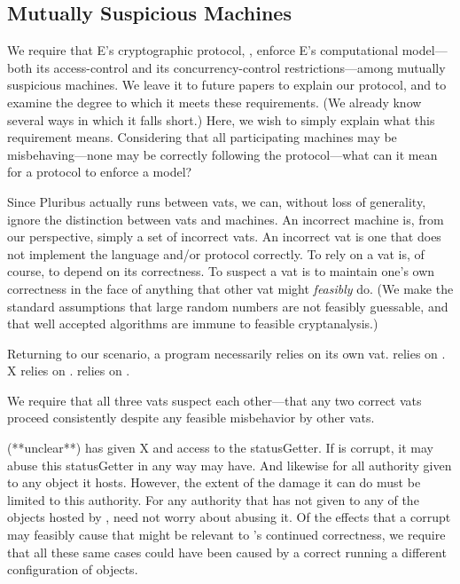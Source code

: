 \documentclass{llncs}
\begin{document}
\subsection{Mutually Suspicious Machines}

We require that E's cryptographic protocol, , enforce E's
computational model---both its access-control and its
concurrency-control restrictions---among mutually suspicious
machines. We leave it to future papers to explain our protocol, and to
examine the degree to which it meets these requirements. (We already
know several ways in which it falls short.) Here, we wish to simply
explain what this requirement means. Considering that all
participating machines may be misbehaving---none may be correctly
following the protocol---what can it mean for a protocol to enforce a
model?

Since Pluribus actually runs between vats, we can, without loss of
generality, ignore the distinction between vats and machines. An
incorrect machine is, from our perspective, simply a set of incorrect
vats. An incorrect vat is one that does not implement the language
and/or protocol correctly. To rely on a vat is, of course, to depend
on its correctness. To suspect a vat is to maintain one's own
correctness in the face of anything that other vat might
\emph{feasibly} do. (We make the standard assumptions that large
random numbers are not feasibly guessable, and that well accepted
algorithms are immune to feasible cryptanalysis.)

Returning to our scenario, a program necessarily relies on its own
vat.  relies on . X relies on .  relies
on .

We require that all three vats suspect each other---that any two
correct vats proceed consistently despite any feasible misbehavior by
other vats.

(**unclear**)  has given X and  access to the
statusGetter. If  is corrupt, it may abuse this statusGetter in
any way  may have. And likewise for all authority given to any
object it hosts. However, the extent of the damage it can do must be
limited to this authority. For any authority that  has not
given to any of the objects hosted by ,  need not
worry about  abusing it. Of the effects that a corrupt 
may feasibly cause that might be relevant to 's continued
correctness, we require that all these same cases could have been
caused by a correct  running a different configuration of
objects.
\end{document}
